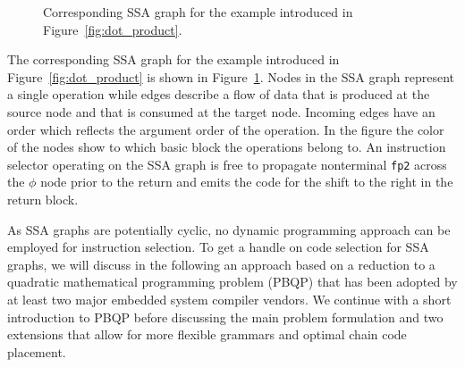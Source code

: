 \begin{figure}
\begin{center}
  \end{center}
  \caption{Corresponding SSA graph for the example introduced in
    Figure~\ref{fig:dot_product}.}\label{fig:ssa_graph}
\end{figure}

The corresponding SSA graph for the example introduced in
Figure~\ref{fig:dot_product} is shown in Figure~\ref{fig:ssa_graph}.
Nodes in the SSA graph represent a single operation while edges
describe a flow of data that is produced at the source node and that
is consumed at the target node. Incoming edges have an order which reflects the argument
order of the operation. In the figure the color of the nodes
show to which basic block the operations belong to. An instruction
selector operating on the SSA graph is free to propagate nonterminal \texttt{fp2}
across the $\phi$ node prior to the return and emits the
code for the shift to the right in the return block.

As SSA graphs are potentially cyclic, no dynamic
programming approach can be employed for instruction selection. To get
a handle on code selection for SSA graphs, we will discuss in the following
an approach based on a reduction to a quadratic mathematical programming
problem (PBQP) \cite{EcksteinKS03,1269857,Ebner08} that has been adopted
by at least two major embedded system compiler vendors. We continue with a short
introduction to PBQP before discussing the main problem formulation
and two extensions that allow for more flexible grammars and optimal
chain code placement.

